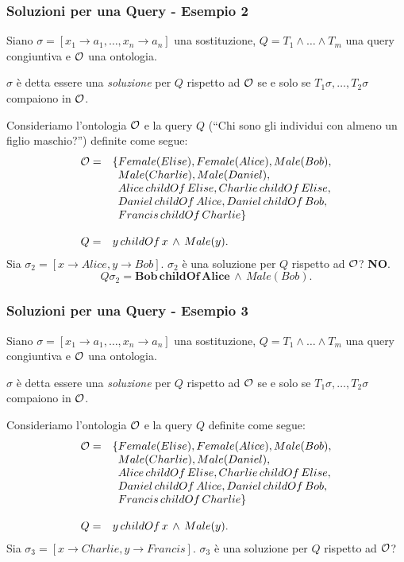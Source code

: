 \documentclass[8pt]{beamer}
\begin{document}
\begin{frame}
\frametitle{Soluzioni per una Query - Esempio 2}
Siano $\sigma=[x_1 \rightarrow a_1, \ldots, x_n \rightarrow a_n]$ una sostituzione,
$Q=T_1 \wedge \ldots \wedge T_m$ una query congiuntiva e $\mathcal{O}$ una ontologia.
\vspace{\baselineskip}

$\sigma$ \`e detta essere una \emph{soluzione} per $Q$ rispetto ad $\mathcal{O}$ se
e solo se $T_1\sigma, \ldots, T_2\sigma$ compaiono in $\mathcal{O}$. 
\vspace{\baselineskip}

Consideriamo l'ontologia $\mathcal{O}$ e la query $Q$ (``Chi sono gli individui con almeno un figlio maschio?'') definite come segue:
\[
\begin{array}{cl}
  \Ont  =  &  \{Female(Elise), Female(Alice), Male(Bob), \\
  &\phantom{\{}Male(Charlie), Male(Daniel), \\
  &\phantom{\{}Alice\,childOf\,Elise, Charlie\,childOf\,Elise, \\
  &\phantom{\{}Daniel\,childOf\,Alice, Daniel\,childOf\,Bob, \\
  &\phantom{\{}Francis\,childOf\,Charlie \}\\
  &\\
  Q = & y\,childOf\,x\,\wedge\,Male(y) .
 \end{array}
\]
Sia $\sigma_2=[x \rightarrow Alice, y \rightarrow Bob]$. $\sigma_2$ \`e una soluzione per $Q$
rispetto ad $\mathcal{O}$? \textbf{NO}.
\[
 Q\sigma_2 = \mathbf{Bob\,childOf\,Alice}\,\wedge\,Male(Bob) .
\]
\end{frame}

\begin{frame}
\frametitle{Soluzioni per una Query - Esempio 3}
Siano $\sigma=[x_1 \rightarrow a_1, \ldots, x_n \rightarrow a_n]$ una sostituzione,
$Q=T_1 \wedge \ldots \wedge T_m$ una query congiuntiva e $\mathcal{O}$ una ontologia.
\vspace{\baselineskip}

$\sigma$ \`e detta essere una \emph{soluzione} per $Q$ rispetto ad $\mathcal{O}$ se
e solo se $T_1\sigma, \ldots, T_2\sigma$ compaiono in $\mathcal{O}$. 
\vspace{\baselineskip}

Consideriamo l'ontologia $\mathcal{O}$ e la query $Q$ definite come segue:
\[
\begin{array}{cl}
  \Ont  =  &  \{Female(Elise), Female(Alice), Male(Bob), \\
  &\phantom{\{}Male(Charlie), Male(Daniel), \\
  &\phantom{\{}Alice\,childOf\,Elise, Charlie\,childOf\,Elise, \\
  &\phantom{\{}Daniel\,childOf\,Alice, Daniel\,childOf\,Bob, \\
  &\phantom{\{}Francis\,childOf\,Charlie \}\\
  &\\
  Q = & y\,childOf\,x\,\wedge\,Male(y) .
 \end{array}
\]
Sia $\sigma_3=[x \rightarrow Charlie, y \rightarrow Francis]$. $\sigma_3$ \`e una soluzione per $Q$
rispetto ad $\mathcal{O}$?
\end{frame}
\end{document}
